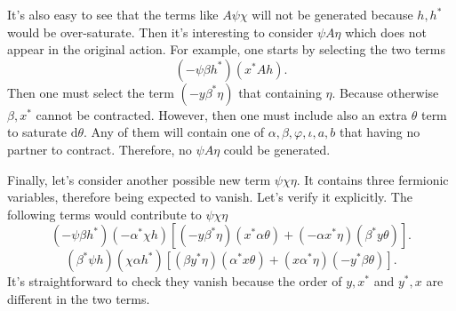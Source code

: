 It's also easy to see that the terms like $A\psi\chi$ will not be generated because $h,h^*$ would be over-saturate.
Then it's interesting to consider $\psi A \eta$ which does not appear in the original action.
For example, one starts by selecting the two terms
\[
	(-\psi \beta h^*) (x^* A h)
.\] 
Then one must select the term $(- y \beta^* \eta)$ that containing $\eta$.
Because otherwise $\beta,x^*$ cannot be contracted.
However, then one must include also an extra $\theta$ term to saturate $\mathrm{d}\theta$.
Any of them will contain one of $\alpha,\beta,\varphi,\iota,a,b$ that having no partner to contract.
Therefore, no $\psi A \eta$ could be generated.

Finally, let's consider another possible new term $\psi\chi\eta$.
It contains three fermionic variables, therefore being expected to vanish.
Let's verify it explicitly.
The following terms would contribute to $\psi\chi\eta$
\[
	(-\psi \beta h^*) (- \alpha^* \chi h) \left[(-y \beta^* \eta)(x^* \alpha \theta) + (-\alpha x^* \eta)(\beta^* y \theta)\right]
.\] 
\[
	(\beta^* \psi h)(\chi \alpha h^*)\left[(\beta y^* \eta)(\alpha^* x \theta) + (x \alpha^* \eta)(-y^* \beta \theta)\right]
.\] 
It's straightforward to check they vanish because the order of $y,x^*$ and $y^*,x$ are different in the two terms.
